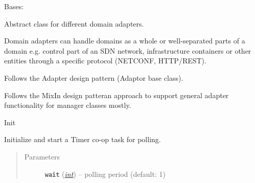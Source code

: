 \documentclass[letterpaper,10pt,english]{sphinxmanual}
\begin{document}
\begin{fulllineitems}
\label{util/adapter:escape.util.adapter.AbstractDomainAdapter}
Bases: 

Abstract class for different domain adapters.

Domain adapters can handle domains as a whole or well-separated parts of a
domain e.g. control part of an SDN network, infrastructure containers or
other entities through a specific protocol (NETCONF, HTTP/REST).

Follows the Adapter design pattern (Adaptor base class).

Follows the MixIn design patteran approach to support general adapter
functionality for manager classes mostly.

\begin{fulllineitems}
\label{util/adapter:escape.util.adapter.AbstractDomainAdapter._eventMixin_events}
\end{fulllineitems}


\begin{fulllineitems}
\label{util/adapter:escape.util.adapter.AbstractDomainAdapter.name}
\end{fulllineitems}


\begin{fulllineitems}
\label{util/adapter:escape.util.adapter.AbstractDomainAdapter.__init__}
Init

\end{fulllineitems}


\begin{fulllineitems}
\label{util/adapter:escape.util.adapter.AbstractDomainAdapter.start_polling}
Initialize and start a Timer co-op task for polling.
\begin{quote}\begin{description}
\item[{Parameters}] \leavevmode
\textbf{\texttt{wait}} (\href{https://docs.python.org/2.7/library/functions.html\#int}{\emph{int}}) -- polling period (default: 1)


\end{description}
\end{quote}
\end{fulllineitems}
\end{fulllineitems}
\end{document}

